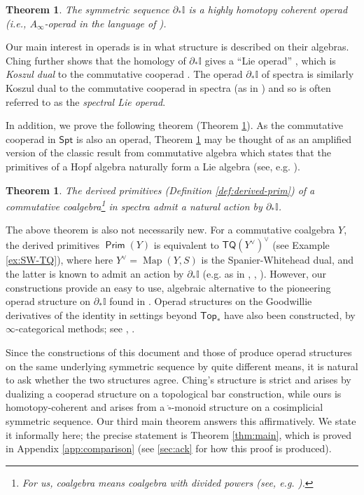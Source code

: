 \documentclass[12pt]{amsart}
\newtheorem{theorem}[subsection]{Theorem}
\theoremstyle{definition}
\theoremstyle{remark}
\newcommand{\Top}{\mathsf{Top}_*}
\newcommand{\Spt}{\mathsf{Spt}}
\newcommand{\TQ}{\mathsf{TQ}}
\newcommand{\Map}{\operatorname{Map}}
\newcommand{\Id}{\mathbb{I}}
\newcommand{\boxcirc}{\mathring{\square}}
\newcommand{\Prim}{\operatorname{\mathsf{Prim}}}
\begin{document}
\begin{theorem} \label{thm:main-1}
The symmetric sequence $\partial_*\Id$ is a highly homotopy coherent operad (i.e., $A_{\infty}$-operad in the language of \cite{Clark-1}).
\end{theorem}

Our main interest in operads is in what structure is described on their algebras. Ching further shows that the homology of $\partial_*\Id$ gives a ``Lie operad'' \cite{Ching-thesis}, which is \textit{Koszul dual} to the commutative cooperad \cite{Ginz-Kap}. The operad $\partial_*\Id$ of spectra is similarly Koszul dual to the commutative cooperad in spectra (as in \cite{FG}) and so is often referred to as the \textit{spectral Lie operad}.

In addition, we prove the following theorem (Theorem \ref{thm:main-2}). As the commutative cooperad in $\Spt$ is also an operad, Theorem \ref{thm:main-2} may be thought of as an amplified version of the classic result from commutative algebra which states that the primitives of a Hopf algebra naturally form a Lie algebra (see, e.g. \cite{Abe}).

\begin{theorem} \label{thm:main-2}
    The derived primitives (Definition \ref{def:derived-prim}) of a commutative coalgebra\footnote{For us, coalgebra means \textit{coalgebra with divided powers} (see, e.g. \cite{FG}).} in spectra admit a natural action by $\partial_*\Id$.
\end{theorem}

The above theorem is also not necessarily new. For a commutative coalgebra $Y$, the derived primitives $\Prim(Y)$ is equivalent to $\TQ(Y^{\vee})^{\vee}$ (see Example \ref{ex:SW-TQ}), where here $Y^{\vee}=\Map(Y,S)$ is the Spanier-Whitehead dual, and the latter is known to admit an action by $\partial_* \Id$ (e.g. as in \cite{Ching-thesis}, \cite{BR}, \cite{Heuts-vn}).  However, our constructions provide an easy to use, algebraic alternative to the pioneering operad structure on $\partial_*\Id$ found in \cite{Ching-thesis}. Operad structures on the Goodwillie derivatives of the identity in settings beyond $\Top$ have also been constructed, by $\infty$-categorical methods; see \cite{Ching-day-conv}, \cite{BH-charLie}.

Since the constructions of this document and those of \cite{Ching-thesis} produce operad structures on the same underlying symmetric sequence by quite different means, it is natural to ask whether the two structures agree. Ching's structure is strict and arises by dualizing a cooperad structure on a topological bar construction, while ours is homotopy-coherent and arises from a $\boxcirc$-monoid structure on a cosimplicial symmetric sequence. Our third main theorem answers this affirmatively. We state it informally here; the precise statement is Theorem \ref{thm:main}, which is proved in Appendix \ref{app:comparison} (see \ref{sec:ack} for how this proof is produced).
\end{document}
